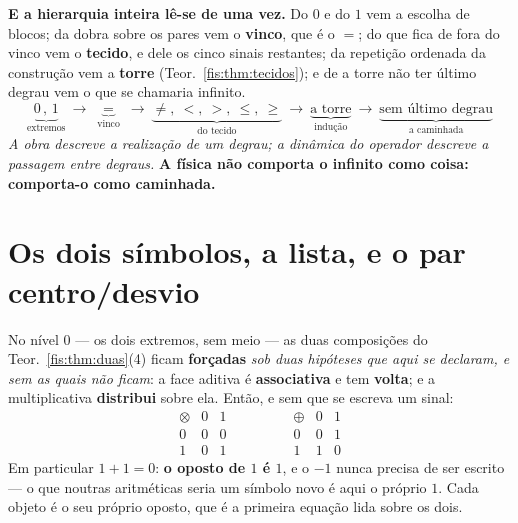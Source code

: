 \documentclass[livro.tex]{subfiles}
\begin{document}
\medskip\noindent\textbf{E a hierarquia inteira lê-se de uma vez.} Do $0$ e do
$1$ vem a escolha de blocos; da dobra sobre os pares vem o \textbf{vinco}, que é
o $=$; do que fica de fora do vinco vem o \textbf{tecido}, e dele os cinco
sinais restantes; da repetição ordenada da construção vem a \textbf{torre}
(Teor.~\ref{fis:thm:tecidos}); e de a torre não ter último degrau vem o que se
chamaria infinito.
\[
\underbrace{0\,,\,1}_{\text{extremos}}\ \longrightarrow\
\underbrace{=}_{\text{vinco}}\ \longrightarrow\
\underbrace{\neq,\ <,\ >,\ \le,\ \ge}_{\text{do tecido}}\ \longrightarrow\
\underbrace{\text{a torre}}_{\text{indução}}\ \longrightarrow\
\underbrace{\text{sem último degrau}}_{\text{a caminhada}}
\]
\emph{A obra descreve a realização de um degrau; a dinâmica do operador descreve
a passagem entre degraus.} \textbf{A física não comporta o infinito como coisa:
comporta-o como caminhada.}

\section{Os dois símbolos, a lista, e o par centro/desvio}\label{fis:binario}

\begin{teorema}\label{fis:thm:B}
No nível $0$ --- os dois extremos, sem meio --- as duas composições do
Teor.~\ref{fis:thm:duas}(4) ficam \textbf{forçadas} \emph{sob duas hipóteses que
aqui se declaram, e sem as quais não ficam}: a face aditiva é
\textbf{associativa} e tem \textbf{volta}; e a multiplicativa
\textbf{distribui} sobre ela. Então, e sem que se escreva um sinal:
\[
\begin{array}{c|cc}
\otimes & 0 & 1\\\hline
0 & 0 & 0\\
1 & 0 & 1
\end{array}
\qquad\qquad
\begin{array}{c|cc}
\oplus & 0 & 1\\\hline
0 & 0 & 1\\
1 & 1 & 0
\end{array}
\]
Em particular $1+1=0$: \textbf{o oposto de $1$ é $1$}, e o $-1$ nunca precisa de
ser escrito --- o que noutras aritméticas seria um símbolo novo é aqui o próprio
$1$. Cada objeto é o seu próprio oposto, que é a primeira equação lida sobre os
dois.
\end{teorema}
\end{document}

